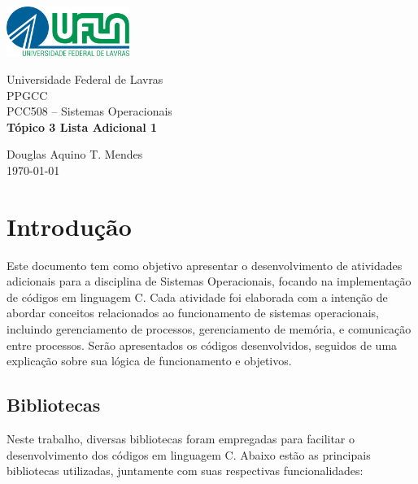 \documentclass{article}
\begin{document}
\begin{titlepage}
    \centering
    \includegraphics[width=0.3\textwidth]{./Images/Logo UFLA - Colorida chapada.png}

    \vspace*{2cm} %
    \Large
    Universidade Federal de Lavras\\
    PPGCC\\
    PCC508 – Sistemas Operacionais\\
    
    \vspace{2cm} %
    \huge %
    \textbf{Tópico 3 Lista Adicional 1}
    
    \vfill %
    
    \large
    Douglas Aquino T. Mendes\\
    \today %
\end{titlepage}

\tableofcontents
\newpage

\section{Introdução}
Este documento tem como objetivo apresentar o desenvolvimento de atividades adicionais para a disciplina de Sistemas Operacionais, focando na implementação de códigos em linguagem C. Cada atividade foi elaborada com a intenção de abordar conceitos relacionados ao funcionamento de sistemas operacionais, incluindo gerenciamento de processos, gerenciamento de memória, e comunicação entre processos. Serão apresentados os códigos desenvolvidos, seguidos de uma explicação sobre sua lógica de funcionamento e objetivos.

\subsection{Bibliotecas}
Neste trabalho, diversas bibliotecas foram empregadas para facilitar o desenvolvimento dos códigos em linguagem C. Abaixo estão as principais bibliotecas utilizadas, juntamente com suas respectivas funcionalidades:
\end{document}
